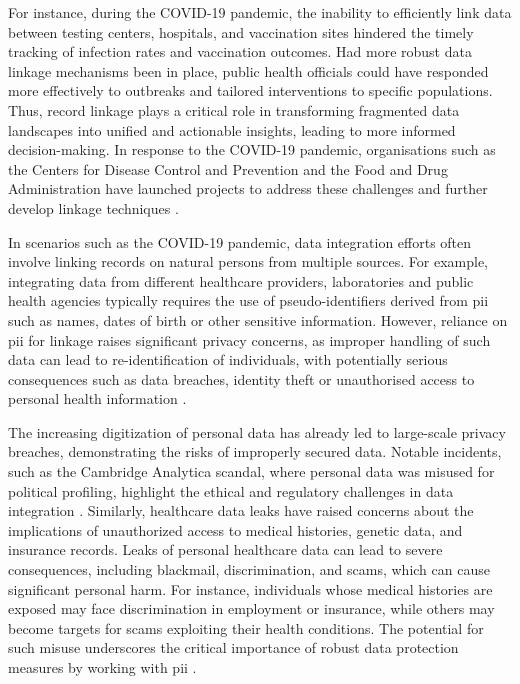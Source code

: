 For instance, during the COVID-19 pandemic, the inability to efficiently link data between testing centers, hospitals, and vaccination sites hindered the timely tracking of infection rates and vaccination outcomes. 
Had more robust data linkage mechanisms been in place, public health officials could have responded more effectively to outbreaks and tailored interventions to specific populations. 
Thus, record linkage plays a critical role in transforming fragmented data landscapes into unified and actionable insights, leading to more informed decision-making.
In response to the COVID-19 pandemic, organisations such as the Centers for Disease Control and Prevention and the Food and Drug Administration have launched projects to address these challenges and further develop linkage techniques \cite{pathak2024privacy}.

In scenarios such as the COVID-19 pandemic, data integration efforts often involve linking records on natural persons from multiple sources.
For example, integrating data from different healthcare providers, laboratories and public health agencies typically requires the use of pseudo-identifiers derived from \ac{pii} such as names, dates of birth or other sensitive information. 
However, reliance on \ac{pii} for linkage raises significant privacy concerns, as improper handling of such data can lead to re-identification of individuals, with potentially serious consequences such as data breaches, identity theft or unauthorised access to personal health information \cite{pathak2024privacy, schnell2009privacy}.

The increasing digitization of personal data has already led to large-scale privacy breaches, demonstrating the risks of improperly secured data. 
Notable incidents, such as the Cambridge Analytica scandal, where personal data was misused for political profiling, highlight the ethical and regulatory challenges in data integration \cite{isaak2018user}. 
Similarly, healthcare data leaks have raised concerns about the implications of unauthorized access to medical histories, genetic data, and insurance records.
Leaks of personal healthcare data can lead to severe consequences, including blackmail, discrimination, and scams, which can cause significant personal harm. 
For instance, individuals whose medical histories are exposed may face discrimination in employment or insurance, while others may become targets for scams exploiting their health conditions. 
The potential for such misuse underscores the critical importance of robust data protection measures by working with \ac{pii} \cite{smith2016examining}.

